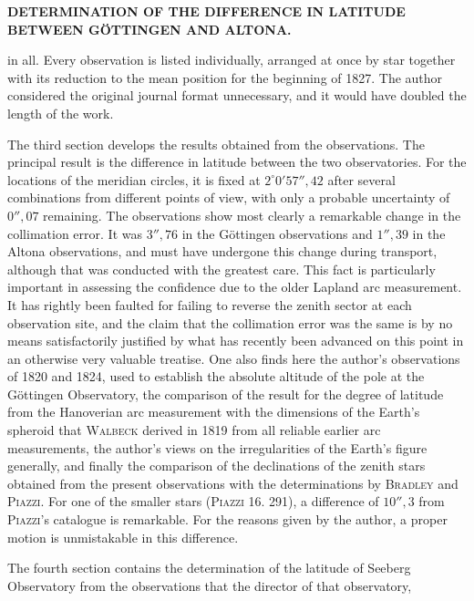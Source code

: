 \par\clearpage
\noindent\makebox[12mm][l]{}\parbox[t]{\dimexpr\linewidth-24mm\relax}{\centering\scriptsize\bfseries DETERMINATION OF THE DIFFERENCE IN LATITUDE BETWEEN GÖTTINGEN AND ALTONA.}\par\medskip

\noindent in all. Every observation is listed individually, arranged at once
by star together with its reduction to the mean position for the beginning of
1827. The author considered the original journal format unnecessary, and it
would have doubled the length of the work.

The third section develops the results obtained from the observations. The
principal result is the difference in latitude between the two observatories.
For the locations of the meridian circles, it is fixed at \(2^\circ0'57''{,}42\)
after several combinations from different points of view, with only a
probable uncertainty of \(0''{,}07\) remaining. The observations show most
clearly a remarkable change in the collimation error. It was \(3''{,}76\)
in the Göttingen observations and \(1''{,}39\) in the Altona observations, and
must have undergone this change during transport, although that was conducted
with the greatest care. This fact is particularly important in assessing
the confidence due to the older Lapland arc measurement. It has rightly
been faulted for failing to reverse the zenith sector at each observation
site, and the claim that the collimation error was the same is by no means
satisfactorily justified by what has recently been advanced on this point
in an otherwise very valuable treatise. One also finds here the author's
observations of 1820 and 1824, used to establish the absolute altitude of the
pole at the Göttingen Observatory, the comparison of the result for the
degree of latitude from the Hanoverian arc measurement with the dimensions
of the Earth's spheroid that \textsc{Walbeck} derived in 1819 from all reliable
earlier arc measurements, the author's views on the irregularities of the
Earth's figure generally, and finally the comparison of the declinations of
the zenith stars obtained from the present observations with the determinations
by \textsc{Bradley} and \textsc{Piazzi}. For one of the smaller stars
(\textsc{Piazzi} 16. 291), a difference of \(10''{,}3\) from \textsc{Piazzi}'s
catalogue is remarkable. For the reasons given by the author, a proper motion
is unmistakable in this difference.

The fourth section contains the determination of the latitude of Seeberg
Observatory from the observations that the director of that observatory,
\par
\par
\endgroup

